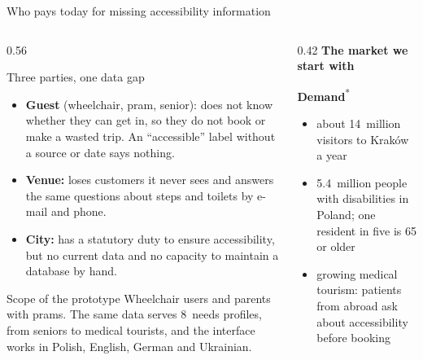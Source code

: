 \begin{frame}{Who pays today for missing accessibility information}
  \begin{columns}[T,onlytextwidth]
    \begin{column}{0.56\textwidth}
      \begin{block}{Three parties, one data gap}
        \footnotesize
        \begin{itemize}
          \item \textbf{Guest} (wheelchair, pram, senior): does not know whether they can get in, so they do not book
                or make a wasted trip. An “accessible” label without a source or date says nothing.
          \item \textbf{Venue:} loses customers it never sees and answers the same questions about steps
                and toilets by e-mail and phone.
          \item \textbf{City:} has a statutory duty to ensure accessibility, but no current data
                and no capacity to maintain a database by hand.
        \end{itemize}
      \end{block}
      \begin{exampleblock}{Scope of the prototype}
        \footnotesize
        Wheelchair users and parents with prams. The same data serves 8~needs profiles, from seniors to
        medical tourists, and the interface works in Polish, English, German and Ukrainian.
      \end{exampleblock}
    \end{column}
    \begin{column}{0.42\textwidth}
      \textbf{\small The market we start with}\\
      \vspace{1mm}

      \hfill{}\hfill{}
      \vspace{2mm}

      \textbf{\small Demand}\textsuperscript{*}
      \footnotesize
      \begin{itemize}
        \item about 14~million visitors to Kraków a year
        \item 5.4~million people with disabilities in Poland; one resident in five is 65 or older
        \item growing medical tourism: patients from abroad ask about accessibility before booking
      \end{itemize}
      \vspace{1mm}
    \end{column}
  \end{columns}


\end{frame}

